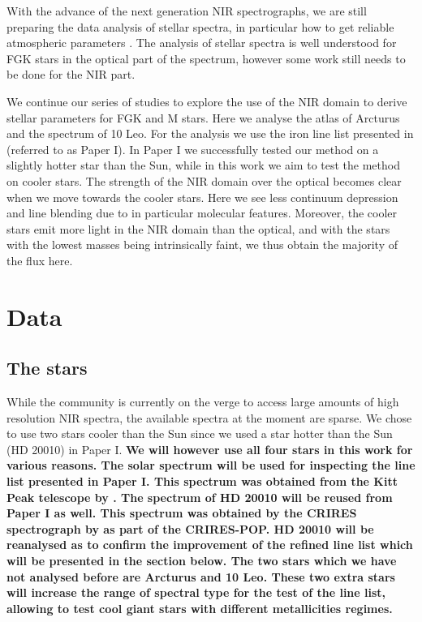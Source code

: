 \documentclass{aa}
\begin{document}
With the advance of the next generation NIR spectrographs, we are still
preparing the data analysis of stellar spectra, in particular how to get
reliable atmospheric parameters \citep[see e.g.][]{Onehag2012,Lindgren2016,Andreasen2016}.
The analysis of stellar spectra is well understood for FGK stars in the optical
part of the spectrum, however some work still needs to be done for the NIR part.

We continue our series of studies to explore the use of the NIR domain to derive
stellar parameters for FGK and M stars. Here we analyse the atlas of Arcturus
and the spectrum of 10 Leo. For the analysis we use the iron line list presented
in \citet{Andreasen2016} (referred to as Paper I). In Paper I we successfully
tested our method on a slightly hotter star than the Sun, while in this work we
aim to test the method on cooler stars. The strength of the NIR domain over the
optical becomes clear when we move towards the cooler stars. Here we see less
continuum depression and line blending due to in particular molecular features.
Moreover, the cooler stars emit more light in the NIR domain than the optical,
and with the stars with the lowest masses being intrinsically faint, we thus
obtain the majority of the flux here.



\section{Data}
\label{sec:data}

\subsection{The stars}

While the community is currently on the verge to access large amounts of high
resolution NIR spectra, the available spectra at the moment are sparse. We chose
to use two stars cooler than the Sun since we used a star hotter than the Sun
(HD 20010) in Paper I. {\bf We will however use all four stars in this work for
various reasons. The solar spectrum will be used for inspecting the line list
presented in Paper I. This spectrum was obtained from the Kitt Peak telescope by
\citet{Hinkle1995}. The spectrum of HD 20010 will be reused from Paper I as
well. This spectrum was obtained by the CRIRES spectrograph by
\citet{Lebzelter2012} as part of the CRIRES-POP. HD 20010 will be reanalysed as
to confirm the improvement of the refined line list which will be presented in
the section below. The two stars which we have not analysed before are Arcturus
and 10 Leo. These two extra stars will increase the range of spectral type for
the test of the line list, allowing to test cool giant stars with different
metallicities regimes.}
\end{document}
